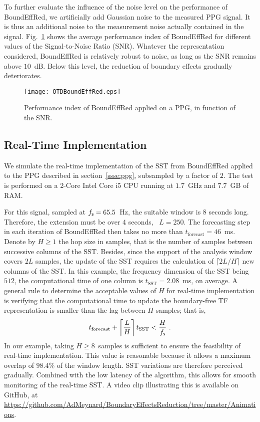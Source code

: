 To further evaluate the influence of the noise level on the performance of {\sf BoundEffRed}, we artificially add Gaussian noise to the measured PPG signal. It is thus an additional noise to the measurement noise actually contained in the signal. Fig.~\ref{fig:otd.noise} shows the average performance index of {\sf BoundEffRed} for different values of the Signal-to-Noise Ratio (SNR). Whatever the representation considered, {\sf BoundEffRed} is relatively robust to noise, as long as the SNR remains above $10$~dB. Below this level, the reduction of boundary effects gradually deteriorates.

\begin{figure}
\centering
\texttt{[image: OTDBoundEffRed.eps]}
\caption{Performance index of {\sf BoundEffRed} applied on a PPG, in function of the SNR.}
\label{fig:otd.noise}
\end{figure}


\subsection{Real-Time Implementation}
We simulate the real-time implementation of the SST from {\sf BoundEffRed} applied to the PPG described in section~\ref{ssse:ppg}, subsampled by a factor of $2$. The test is performed on a 2-Core Intel Core i5 CPU running at $1.7$~GHz and $7.7$~GB of RAM. 

For this signal, sampled at $f_{\mathsf s}=65.5$~Hz, the suitable window is $8$ seconds long. Therefore, the extension must be over $4$ seconds, \ie~$L=250$. The forecasting step in each iteration of {\sf BoundEffRed} then takes no more than $t_{\mathrm{forecast}}=46$~ms. Denote by $H\geq 1$ the hop size in samples, that is the number of samples between successive columns of the SST. Besides, since the support of the analysis window covers $2L$ samples, the update of the SST requires the calculation of $\lceil 2L/H \rceil$ new columns of the SST. In this example, the frequency dimension of the SST being $512$, the computational time of one column is $t_{\mathrm{SST}}=2.08$~ms, on average. A general rule to determine the acceptable values of $H$ for real-time implementation is verifying that the computational time to update the boundary-free TF representation is smaller than the lag between $H$ samples; that is,
\[
t_{\mathrm{forecast}} + \left\lceil \frac{L}H \right\rceil t_{\mathrm{SST}} < \frac{H}\fs\ . 
\]
In our example, taking $H\geq 8$~samples is sufficient to ensure the feasibility of real-time implementation. This value is reasonable because it allows a maximum overlap of $98.4\%$ of the window length. SST variations are therefore perceived gradually. Combined with the low latency of the algorithm, this allows for smooth monitoring of the real-time SST. A video clip illustrating this is available on GitHub, at \url{https://github.com/AdMeynard/BoundaryEffectsReduction/tree/master/Animations}. 